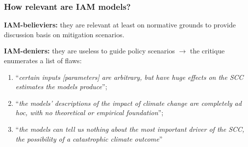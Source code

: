 \documentclass[xcolor=x11names,compress,aspectratio=169]{beamer}%
\makeatletter
\newenvironment{stepenumeratewithalert}{\begin{enumerate}[<+-| alert@+>]}{\end{enumerate}}
\newenvironment{stepitemizewithalert}{\begin{itemize}[<+-| alert@+>]}{\end{itemize} }
\renewenvironment{itemize}{\begin{compactitemize}[<+-| alert@+>]}{\end{compactitemize}}
\renewenvironment{stepitemizewithalert}{\begin{compactitemize}[<+-| alert@+>]}{\end{compactitemize}}
\renewenvironment{stepitemizewithalert}{\begin{itemize}}{\end{itemize}}
\renewenvironment{stepenumeratewithalert}{\begin{enumerate}}{\end{enumerate}}
\makeatother
\begin{document}
\begin{frame}%


\frametitle{How relevant are IAM models?}
\vspace{3ex}%


\begin{stepitemizewithalert}
\item \textbf{IAM-believiers:} they are relevant at least on normative grounds
to provide discussion basis on mitigation scenarios.%
\vspace{3ex}%


\item \textbf{IAM-deniers:} they are useless to guide policy scenarios
$\rightarrow$ the \cite{pindyck2013climate,pindyck2017use} critique enumerates
a list of flaws:%
\vspace{1.5ex}%


\begin{stepenumeratewithalert}
\item \textquotedblleft\textit{certain inputs [parameters] are arbitrary, but
have huge effects on the SCC estimates the models produce}\textquotedblright;%
\vspace{1ex}%


\item \textquotedblleft\textit{the models' descriptions of the impact of
climate change are completely ad hoc, with no theoretical or empirical
foundation}\textquotedblright;%
\vspace{1ex}%


\item \textquotedblleft\textit{the models can tell us nothing about the most
important driver of the SCC, the possibility of a catastrophic climate
outcome}\textquotedblright%
\vspace{1.5ex}%

\end{stepenumeratewithalert}
\end{stepitemizewithalert}

%

\transboxout
\end{frame}%
\end{document}
